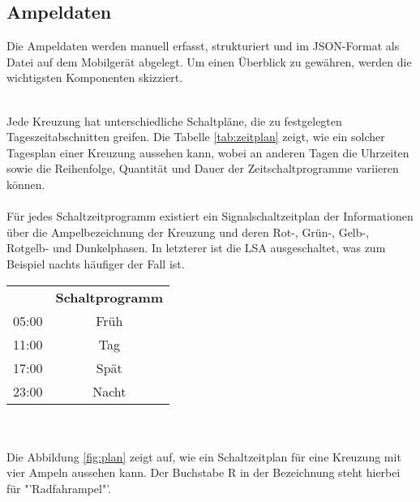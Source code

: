 \subsection{Ampeldaten}
Die Ampeldaten werden manuell erfasst, strukturiert und im \gls{JSON}-Format als Datei auf dem Mobilgerät abgelegt. Um einen Überblick zu gewähren, werden die wichtigsten Komponenten skizziert. \\\\
\begin{minipage}{0.6\textwidth}
Jede Kreuzung hat unterschiedliche Schaltpläne, die zu festgelegten Tageszeitabschnitten greifen. Die Tabelle \ref{tab:zeitplan} zeigt, wie ein solcher Tagesplan einer Kreuzung aussehen kann, wobei an anderen Tagen die Uhrzeiten sowie die Reihenfolge, Quantität und Dauer der Zeitschaltprogramme variieren können.\\\\
Für jedes Schaltzeitprogramm existiert ein Signalschaltzeitplan der Informationen über die Ampelbezeichnung der Kreuzung und deren Rot-, Grün-, Gelb-, Rotgelb- und Dunkelphasen. In letzterer ist die \gls{LSA} ausgeschaltet, was zum Beispiel nachts häufiger der Fall ist. 
\end{minipage} \hspace{1cm}
\begin{minipage}{0.3\textwidth}
	\begin{tabular}{@{}cc@{}}
	\toprule
	\rowcolor[HTML]{ECF4FF} 
	\multicolumn{2}{l}{\cellcolor[HTML]{ECF4FF}\textsc{\centering \large Bezeichnung der Kreuzung}}   \\ \midrule
	\rowcolor[HTML]{EFEFEF} 
	\multicolumn{1}{l}{\cellcolor[HTML]{EFEFEF}\textbf{Uhrzeit}} & \multicolumn{1}{l}{\cellcolor[HTML]{EFEFEF}\textbf{Schaltprogramm}} \\ \midrule
05:00 & Früh   \\ \midrule
11:00 & Tag    \\ \midrule
17:00 & Spät   \\ \midrule
23:00 & Nacht  \\ \bottomrule
\end{tabular}
\label{tab:zeitplan}
\end{minipage}
\\ \vspace{0.5cm} \\
Die Abbildung \ref{fig:plan} zeigt auf, wie ein Schaltzeitplan für eine Kreuzung mit vier Ampeln aussehen kann. Der Buchstabe R in der Bezeichnung steht hierbei für "'Radfahrampel"'. \\
